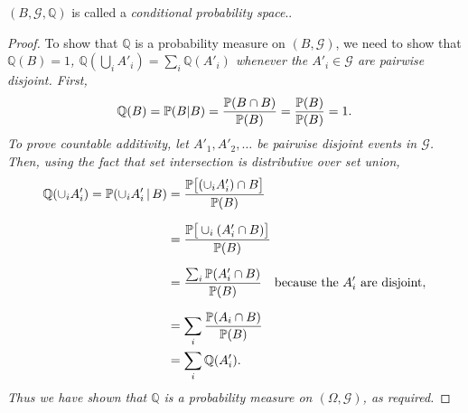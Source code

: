 \begin{remark}
$(B,\mathcal{G},\mathbb{Q})$ is called a \emph{conditional probability space}..
\end{remark}

\begin{proof}
To show that $\mathbb{Q}$ is a probability measure on $(B,\mathcal{G})$, we need to show that 
\bit
\it $\mathbb{Q}(B) = 1$,
\it $\mathbb{Q}\left(\textstyle\bigcup_i A'_i\right) = \sum_i \mathbb{Q}(A'_i)$ whenever the $A'_i\in\mathcal{G}$ are pairwise disjoint.
\eit
First,
\[
\mathbb{Q}(B) = \mathbb{P}(B|B) = \frac{\mathbb{P}(B\cap B)}{\mathbb{P}(B)} = \frac{\mathbb{P}(B)}{\mathbb{P}(B)} = 1.
\]
To prove countable additivity, let $A'_1,A'_2,\ldots$ be pairwise disjoint events in $\mathcal{G}$. Then, using the fact that set intersection is distributive over set union,
\begin{align*}
\mathbb{Q}(\cup_i A'_i) = \mathbb{P}(\cup_i A'_i\,|\,B)
	& = \frac{\mathbb{P}\big[(\cup_i A'_i) \cap B\big]}{\mathbb{P}(B)} \\[1.5ex]
	& = \frac{\mathbb{P}\big[\cup_i (A'_i \cap B)\big]}{\mathbb{P}(B)} \\[1.5ex]
	& = \frac{\sum_i \mathbb{P}(A'_i \cap B)}{\mathbb{P}(B)} \quad\text{because the $A'_i$ are disjoint}, \\[1.5ex]
	& = \sum_i \frac{\mathbb{P}(A_i \cap B)}{\mathbb{P}(B)} \\
	& = \sum_i \mathbb{Q}(A'_i).
\end{align*}
Thus we have shown that $\mathbb{Q}$ is a probability measure on $(\Omega,\mathcal{G})$, as required.
\end{proof}

